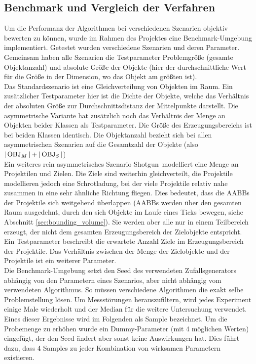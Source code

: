 \subsection{Benchmark und Vergleich der Verfahren}
\label{sec:benchmark}
Um die Performanz der Algorithmen bei verschiedenen Szenarien objektiv bewerten zu können, wurde im Rahmen des Projektes eine Benchmark-Umgebung implementiert. Getestet wurden verschiedene Szenarien und deren Parameter. Gemeinsam haben alle Szenarien die Testparameter Problemgröße (gesamte Objektanzahl) und absolute Größe der Objekte (hier der durchschnittliche Wert für die Größe in der Dimension, wo das Objekt am größten ist).\\
Das Standardszenario ist eine Gleichverteilung von Objekten im Raum. 
Ein zusätzlicher Testparameter hier ist die Dichte der Objekte, welche das Verhältnis der absoluten Größe zur Durchschnittsdistanz der Mittelpunkte darstellt. Die asymmetrische Variante hat zusätzlich noch das Verhältnis der Menge an Objekten beider Klassen als Testparameter. Die Größe des Erzeugungsbereichs ist bei beiden Klassen identisch. Die Objektanzahl bezieht sich bei allen asymmetrischen Szenarien auf die Gesamtzahl der Objekte (also $|\operatorname{OBJ}_M| + |\operatorname{OBJ}_S|$)\\
Ein weiteres rein asymmetrisches Szenario \glqq Shotgun\grqq ~modelliert eine Menge an Projektilen und Zielen. Die Ziele sind weiterhin gleichverteilt, die Projektile modellieren jedoch eine Schrotladung, bei der viele Projektile relativ nahe zusammen in eine sehr ähnliche Richtung fliegen. Dies bedeutet, dass die AABBs der Projektile sich weitgehend überlappen (AABBs werden über den gesamten Raum ausgedehnt, durch den sich Objekte im Laufe eines Ticks bewegen, siehe Abschnitt \ref{sec:bounding_volume}). Sie werden aber alle nur in einem Teilbereich erzeugt, der nicht dem gesamten Erzeugungsbereich der Zielobjekte entspricht. Ein Testparameter beschreibt die erwartete Anzahl Ziele im Erzeugungsbereich der Projektile. Das Verhältnis zwischen der Menge der Zielobjekte und der Projektile ist ein weiterer Parameter.\\
Die Benchmark-Umgebung setzt den Seed des verwendeten Zufallsgenerators abhängig von den Parametern eines Szenarios, aber nicht abhängig vom verwendeten Algorithmus. So müssen verschiedene Algorithmen die exakt selbe Problemstellung lösen. Um Messstörungen herauszufiltern, wird jedes Experiment einige Male wiederholt und der Median für die weitere Untersuchung verwendet. Eines dieser Ergebnisse wird im Folgenden als Sample bezeichnet. Um die Probemenge zu erhöhen wurde ein Dummy-Parameter (mit 4 möglichen Werten) eingefügt, der den Seed ändert aber sonst keine Auswirkungen hat. Dies führt dazu, dass 4 Samples zu jeder Kombination von wirksamen Parametern existieren.\\

